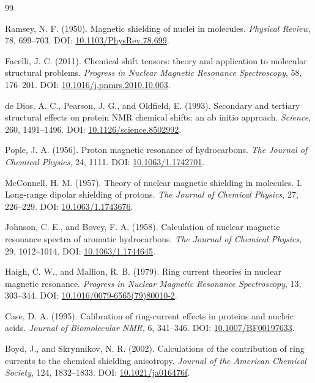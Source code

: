 \documentclass[11pt]{article}
\begin{document}
\begin{thebibliography}{99}

Ramsey, N. F. (1950).
Magnetic shielding of nuclei in molecules.
\emph{Physical Review}, 78, 699--703.
DOI: \href{https://doi.org/10.1103/PhysRev.78.699}{10.1103/PhysRev.78.699}.

Facelli, J. C. (2011).
Chemical shift tensors: theory and application to molecular structural problems.
\emph{Progress in Nuclear Magnetic Resonance Spectroscopy}, 58, 176--201.
DOI: \href{https://doi.org/10.1016/j.pnmrs.2010.10.003}{10.1016/j.pnmrs.2010.10.003}.

de Dios, A. C., Pearson, J. G., and Oldfield, E. (1993).
Secondary and tertiary structural effects on protein NMR chemical shifts:
an ab initio approach.
\emph{Science}, 260, 1491--1496.
DOI: \href{https://doi.org/10.1126/science.8502992}{10.1126/science.8502992}.

Pople, J. A. (1956).
Proton magnetic resonance of hydrocarbons.
\emph{The Journal of Chemical Physics}, 24, 1111.
DOI: \href{https://doi.org/10.1063/1.1742701}{10.1063/1.1742701}.

McConnell, H. M. (1957).
Theory of nuclear magnetic shielding in molecules. I. Long-range dipolar
shielding of protons.
\emph{The Journal of Chemical Physics}, 27, 226--229.
DOI: \href{https://doi.org/10.1063/1.1743676}{10.1063/1.1743676}.

Johnson, C. E., and Bovey, F. A. (1958).
Calculation of nuclear magnetic resonance spectra of aromatic hydrocarbons.
\emph{The Journal of Chemical Physics}, 29, 1012--1014.
DOI: \href{https://doi.org/10.1063/1.1744645}{10.1063/1.1744645}.

Haigh, C. W., and Mallion, R. B. (1979).
Ring current theories in nuclear magnetic resonance.
\emph{Progress in Nuclear Magnetic Resonance Spectroscopy}, 13, 303--344.
DOI: \href{https://doi.org/10.1016/0079-6565(79)80010-2}{10.1016/0079-6565(79)80010-2}.

Case, D. A. (1995).
Calibration of ring-current effects in proteins and nucleic acids.
\emph{Journal of Biomolecular NMR}, 6, 341--346.
DOI: \href{https://doi.org/10.1007/BF00197633}{10.1007/BF00197633}.

Boyd, J., and Skrynnikov, N. R. (2002).
Calculations of the contribution of ring currents to the chemical shielding
anisotropy.
\emph{Journal of the American Chemical Society}, 124, 1832--1833.
DOI: \href{https://doi.org/10.1021/ja016476f}{10.1021/ja016476f}.


\end{thebibliography}
\end{document}
